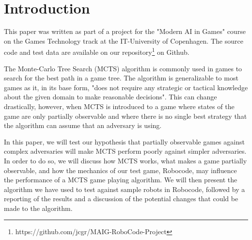 \section{Introduction}
\label{01}
This paper was written as part of a project for the "Modern AI in Games" course on the Games Technology track at the IT-University of Copenhagen. The source code and test data are available on our repository\footnote{https://github.com/jcgr/MAIG-RoboCode-Project} on Github.

The Monte-Carlo Tree Search (MCTS) algorithm is commonly used in games to search for the best path in a game tree. The algorithm is generalizable to most games as it, in its base form, "does not require any strategic or tactical knowledge about the given domain to make reasonable decisions"\cite{mctsai}. This can change drastically, however, when MCTS is introduced to a game where states of the game are only partially observable and where there is no single best strategy that the algorithm can assume that an adversary is using. 

In this paper, we will test our hypothesis that partially observable games against complex adversaries will make MCTS perform poorly against simpler adversaries. In order to do so, we will discuss how MCTS works, what makes a game partially observable, and how the mechanics of our test game, Robocode, may influence the performance of a MCTS game playing algorithm. We will then present the algorithm we have used to test against sample robots in Robocode, followed by a reporting of the results and a discussion of the potential changes that could be made to the algorithm.